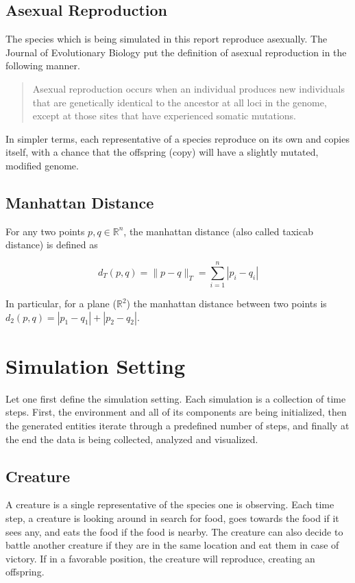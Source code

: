 \documentclass{article}
\begin{document}
\subsection{Asexual Reproduction}

The species which is being simulated in this report reproduce asexually. The Journal of Evolutionary Biology put the definition of asexual reproduction in the following manner.

\begin{quotation}
    Asexual reproduction occurs when an individual produces new individuals that are genetically identical to the ancestor at all loci in the genome, except at those sites that have experienced somatic mutations.
\end{quotation}

In simpler terms, each representative of a species reproduce on its own and copies itself, with a chance that the offspring (copy) will have a slightly mutated, modified genome.

\subsection{Manhattan Distance}

For any two points $p, q \in \mathbb{R}^n$, the manhattan distance (also called taxicab distance) is defined as

\[
    d_T(p, q) = \|p - q\|_T = \sum_{i = 1}^n |p_i - q_i| 
\]

In particular, for a plane ($\mathbb{R}^2$) the manhattan distance between two points is $d_2(p, q) = |p_1 - q_1| + |p_2 - q_2|$.

\newpage

\section{Simulation Setting}

Let one first define the simulation setting. Each simulation is a collection of time steps. First, the environment and all of its components are being initialized, then the generated entities iterate through a predefined number of steps, and finally at the end the data is being collected, analyzed and visualized.

\subsection{Creature}

A creature is a single representative of the species one is observing. Each time step, a creature is looking around in search for food, goes towards the food if it sees any, and eats the food if the food is nearby. The creature can also decide to battle another creature if they are in the same location and eat them in case of victory. If in a favorable position, the creature will reproduce, creating an offspring.
\end{document}
